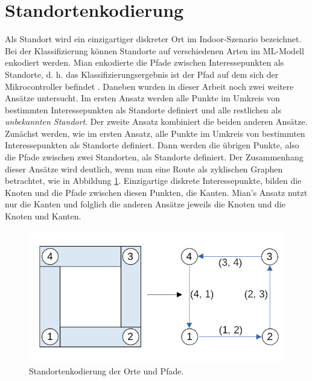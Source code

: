 \section{Standortenkodierung}
Als Standort wird ein einzigartiger diskreter Ort im Indoor-Szenario bezeichnet.
Bei der Klassifizierung können Standorte auf verschiedenen Arten im ML-Modell enkodiert werden.
Mian enkodierte die Pfade zwischen Interessepunkten als Standorte,
d. h. das Klassifizierungsergebnis ist der Pfad auf dem sich der Mikrocontroller befindet \cite{naveedThesis}.
\newline
\newline
Daneben wurden in dieser Arbeit noch zwei weitere Ansätze untersucht.
Im ersten Ansatz werden alle Punkte im Umkreis von bestimmten Interessepunkten als Standorte definiert und alle restlichen als \textit{unbekannten Standort}.
Der zweite Ansatz kombiniert die beiden anderen Ansätze.
Zunächst werden, wie im ersten Ansatz, alle Punkte im Umkreis von bestimmten Interessepunkten als Standorte definiert.
Dann werden die übrigen Punkte, also die Pfade zwischen zwei Standorten, als Standorte definiert.
\newline
\newline
Der Zusammenhang dieser Ansätze wird deutlich, wenn man eine Route als zyklischen Graphen betrachtet, wie in Abbildung \ref{fig:location_encoding}.
Einzigartige diskrete Interessepunkte, bilden die Knoten und die Pfade zwischen diesen Punkten, die Kanten.
Mian's Ansatz nutzt nur die Kanten und folglich die anderen Ansätze jeweils die Knoten und die Knoten und Kanten.
\begin{figure}[h!]
    \centering
    \includegraphics[width=\linewidth]{images/location_encoding.png}
    \caption{Standortenkodierung der Orte und Pfade.}
    \label{fig:location_encoding}
\end{figure}
\newline
